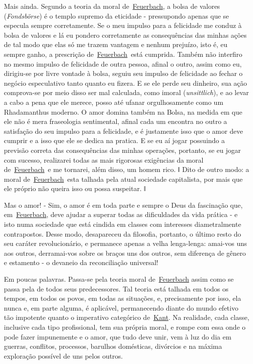 Mais ainda. Segundo a teoria da moral
de~\href{https://www.marxists.org/portugues/dicionario/verbetes/f/feuerbach.htm}{Feuerbach},
a bolsa de valores (\emph{Fondsbörse}) é o templo supremo da eticidade -
pressupondo apenas que se especula sempre corretamente. Se o meu impulso
para a felicidade me conduz à bolsa de valores e lá eu pondero
corretamente as consequências das minhas ações de tal modo que elas só
me trazem vantagem e nenhum prejuízo, isto é, eu sempre ganho, a
prescrição
de~\href{https://www.marxists.org/portugues/dicionario/verbetes/f/feuerbach.htm}{Feuerbach}~está
cumprida. Também não interfiro no mesmo impulso de felicidade de outra
pessoa, afinal o outro, assim como eu, dirigiu-se por livre vontade à
bolsa, seguiu seu impulso de felicidade ao fechar o negócio especulativo
tanto quanto eu fizera. E se ele perde seu dinheiro, sua ação
comprova-se por meio disso ser mal calculada, como imoral
(\emph{unsittlich}), e ao levar a cabo a pena que ele merece, posso até
ufanar orgulhosamente como um Rhadamanthus moderno. O amor domina também
na Bolsa, na medida em que ele não é mera fraseologia sentimental,
afinal cada um encontra no outro a satisfação do seu impulso para a
felicidade, e é justamente isso que o amor deve cumprir e a isso que ele
se dedica na pratica. E se eu aí jogar possuindo a previsão correta das
consequências das minhas operações, portanto, se eu jogar com sucesso,
realizarei todas as mais rigorosas exigências da moral
de~\href{https://www.marxists.org/portugues/dicionario/verbetes/f/feuerbach.htm}{Feuerbach}~e
me tornarei, além disso, um homem rico. ǁ Dito de outro modo: a moral
de~\href{https://www.marxists.org/portugues/dicionario/verbetes/f/feuerbach.htm}{Feuerbach}~esta
talhada pela atual sociedade capitalista, por mais que ele próprio não
queira isso ou possa suspeitar. ǁ

Mas o amor! - Sim, o amor é em toda parte e sempre o Deus da fascinação
que,
em~\href{https://www.marxists.org/portugues/dicionario/verbetes/f/feuerbach.htm}{Feuerbach},
deve ajudar a superar todas as dificuldades da vida prática - e isto
numa sociedade que está cindida em classes com interesses diametralmente
contrapostos. Desse modo, desapareceu da filosofia, portanto, o último
resto do seu caráter revolucionário, e permanece apenas a velha
lenga-lenga: amai-vos uns aos outros, derramai-vos sobre os braços uns
dos outros, sem diferença de gênero e estamento - o devaneio da
reconciliação universal!

Em poucas palavras. Passa-se pela teoria moral
de~\href{https://www.marxists.org/portugues/dicionario/verbetes/f/feuerbach.htm}{Feuerbach}
assim como se passa pela de todos seus predecessores. Tal teoria está
talhada em todos os tempos, em todos os povos, em todas as situações, e,
precisamente por isso, ela nunca e, em parte alguma, é aplicável,
permanecendo diante do mundo efetivo tão impotente quanto o imperativo
categórico
de~\href{https://www.marxists.org/portugues/dicionario/verbetes/k/kant.htm}{Kant}.
Na realidade, cada classe, inclusive cada tipo profissional, tem sua
própria moral, e rompe com essa onde o pode fazer impunemente e o amor,
que tudo deve unir, vem à luz do dia em guerras, conflitos, processos,
barulhos domésticas, divórcios e na máxima exploração possível de uns
pelos outros.

